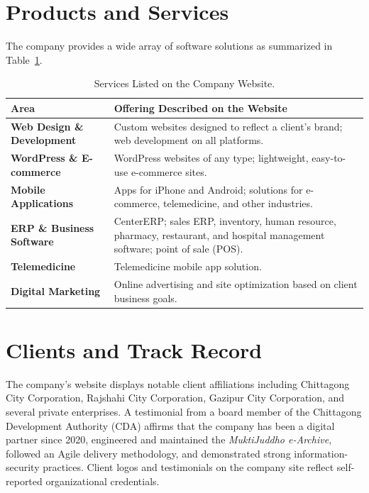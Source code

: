\documentclass[11pt,a4paper,oneside]{report}
\begin{document}
\section{Products and Services}
The company provides a wide array of software solutions as summarized in Table~\ref{tab:company_services}.

\begin{table}[H]
\centering
\small
\begin{tabularx}{\textwidth}{lX}
\toprule
\textbf{Area} & \textbf{Offering Described on the Website} \\
\midrule
\textbf{Web Design \& Development} & Custom websites designed to reflect a client's brand; web development on all platforms. \\
\textbf{WordPress \& E-commerce} & WordPress websites of any type; lightweight, easy-to-use e-commerce sites. \\
\textbf{Mobile Applications} & Apps for iPhone and Android; solutions for e-commerce, telemedicine, and other industries. \\
\textbf{ERP \& Business Software} & CenterERP; sales ERP, inventory, human resource, pharmacy, restaurant, and hospital management software; point of sale (POS). \\
\textbf{Telemedicine} & Telemedicine mobile app solution. \\
\textbf{Digital Marketing} & Online advertising and site optimization based on client business goals. \\
\bottomrule
\end{tabularx}
\caption{Services Listed on the Company Website.}
\label{tab:company_services}
\end{table}

\section{Clients and Track Record}
The company's website displays notable client affiliations including Chittagong City Corporation, Rajshahi City Corporation, Gazipur City Corporation, and several private enterprises. A testimonial from a board member of the Chittagong Development Authority (CDA) affirms that the company has been a digital partner since 2020, engineered and maintained the \emph{MuktiJuddho e-Archive}, followed an Agile delivery methodology, and demonstrated strong information-security practices. Client logos and testimonials on the company site reflect self-reported organizational credentials.
\end{document}
